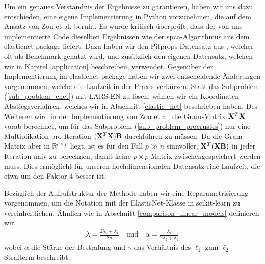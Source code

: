 Um ein genaues Verständnis der Ergebnisse zu garantieren, haben wir uns dazu entschieden, eine eigene Implementierung in Python vorzunehmen, die auf dem Ansatz von Zou et al. beruht. Es wurde kritisch überprüft, dass der von uns implementierte Code dieselben Ergebnissen wie der spca-Algorithmus aus dem elasticnet package liefert. Dazu haben wir den Pitprops Datensatz aus \cite{zou_sparsepca}, welcher oft als Benchmark genutzt wird, und zusätzlich den eigenen Datensatz, welchen wir in Kapitel \ref{application} beschreiben, verwendet. Gegenüber der Implementierung im elasticnet package haben wir zwei entscheidende Änderungen vorgenommen, welche die Laufzeit in der Praxis verkürzen. Statt das Subproblem (\ref{sub_problem_enet}) mit LARS-EN zu lösen, wählen wir ein Koordinaten-Abstiegsverfahren, welches wir in Abschnitt \ref{elastic_net} beschrieben haben. Des Weiteren wird in der Implementierung von Zou et al. die Gram-Matrix $\mathbf{X}^T \mathbf{X}$ vorab berechnet, um für das Subproblem (\ref{sub_problem_procrustes}) nur eine Multiplikation pro Iteration $(\mathbf{X}^T \mathbf{X}) \mathbf{B}$ durchführen zu müssen. Da die Gram-Matrix aber in $\mathbb{R}^{p \times p}$ liegt, ist es für den Fall $p \gg n$ sinnvoller, $\mathbf{X}^T (\mathbf{X} \mathbf{B})$ in jeder Iteration naiv zu berechnen, damit keine $p \times p$-Matrix zwischengespeichert werden muss. Dies ermöglicht für unseren hochdimensionalen Datensatz eine Laufzeit, die etwa um den Faktor $4$ besser ist.

Bezüglich der Aufrufstruktur der Methode haben wir eine Reparametrisierung vorgenommen, um die Notation mit der ElasticNet-Klasse in scikit-learn zu vereinheitlichen. Ähnlich wie in Abschnitt \ref{comparison_linear_models} definieren wir
\begin{align}
\lambda = \frac{2\lambda_2 + \lambda_1}{2n} \quad \text{und} \quad \alpha = \frac{\lambda_1}{2\lambda_2 + \lambda_1}
\end{align}
wobei $\alpha$ die Stärke der Bestrafung und $\gamma$ das Verhältnis des $\ell_1$ zum $\ell_2$-Strafterm beschreibt.